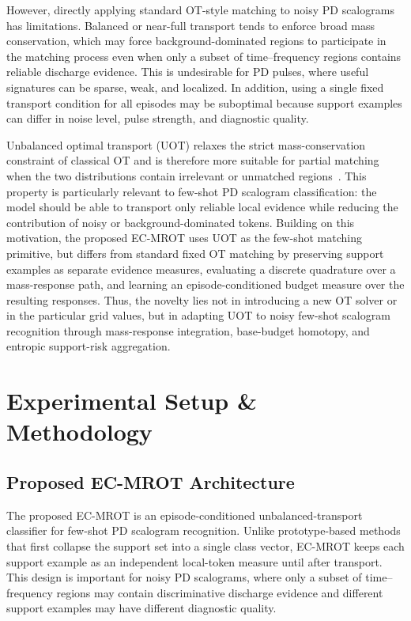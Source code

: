 \documentclass[journal]{IEEEtran}
\newcommand{\method}{EC-MROT}
\newcommand{\1}{\mathbf{1}}
\begin{document}
However, directly applying standard OT-style matching to noisy PD scalograms has limitations. Balanced or near-full transport tends to enforce broad mass conservation, which may force background-dominated regions to participate in the matching process even when only a subset of time--frequency regions contains reliable discharge evidence. This is undesirable for PD pulses, where useful signatures can be sparse, weak, and localized. In addition, using a single fixed transport condition for all episodes may be suboptimal because support examples can differ in noise level, pulse strength, and diagnostic quality.

Unbalanced optimal transport (UOT) relaxes the strict mass-conservation constraint of classical OT and is therefore more suitable for partial matching when the two distributions contain irrelevant or unmatched regions~\cite{Chizat2018UOT}. This property is particularly relevant to few-shot PD scalogram classification: the model should be able to transport only reliable local evidence while reducing the contribution of noisy or background-dominated tokens. Building on this motivation, the proposed \method{} uses UOT as the few-shot matching primitive, but differs from standard fixed OT matching by preserving support examples as separate evidence measures, evaluating a discrete quadrature over a mass-response path, and learning an episode-conditioned budget measure over the resulting responses. Thus, the novelty lies not in introducing a new OT solver or in the particular grid values, but in adapting UOT to noisy few-shot scalogram recognition through mass-response integration, base-budget homotopy, and entropic support-risk aggregation.

\section{Experimental Setup \& Methodology}
\label{sec:experimental_setup_methodology}

\subsection{Proposed \method{} Architecture}
\label{sec:proposed_method}

The proposed \method{} is an episode-conditioned unbalanced-transport classifier for few-shot PD scalogram recognition. Unlike prototype-based methods that first collapse the support set into a single class vector, \method{} keeps each support example as an independent local-token measure until after transport. This design is important for noisy PD scalograms, where only a subset of time--frequency regions may contain discriminative discharge evidence and different support examples may have different diagnostic quality.
\end{document}
